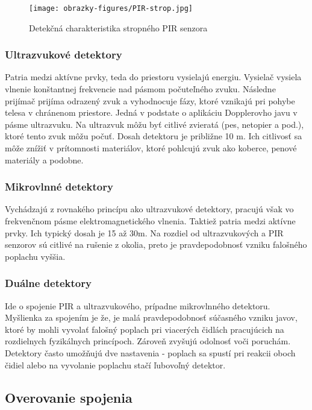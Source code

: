 \begin{figure}[ht]
    \centering
    \texttt{[image: obrazky-figures/PIR-strop.jpg]}
    \caption{Detekčná charakteristika stropného PIR senzora\cite{PIR-strop}}
    \label{fig:pir-strop}
\end{figure}

\subsubsection{Ultrazvukové detektory}

Patria medzi aktívne prvky, teda do priestoru vysielajú energiu. Vysielač vysiela vlnenie konštantnej frekvencie nad pásmom počuteľného zvuku. Následne prijímač prijíma odrazený zvuk a vyhodnocuje fázy, ktoré vznikajú pri pohybe telesa v chránenom priestore. Jedná v podstate o aplikáciu Dopplerovho javu v pásme ultrazvuku. Na ultrazvuk môžu byť citlivé zvieratá (pes, netopier a pod.), ktoré tento zvuk môžu počuť. Dosah detektoru je približne 10 m. Ich citlivosť sa môže znížiť v prítomnosti materiálov, ktoré pohlcujú zvuk ako koberce, penové materiály a podobne.\cite{Krecek}

\subsubsection{Mikrovlnné detektory}

Vychádzajú z rovnakého princípu ako ultrazvukové detektory, pracujú však vo frekvenčnom pásme elektromagnetického vlnenia. Taktiež patria medzi aktívne prvky. Ich typický dosah je 15 až 30m. Na rozdiel od ultrazvukových a PIR senzorov sú citlivé na rušenie z okolia, preto je pravdepodobnosť vzniku falošného poplachu vyššia.\cite{velas_ezs}

\subsubsection{Duálne detektory}

Ide o spojenie PIR a ultrazvukového, prípadne mikrovlnného detektoru. Myšlienka za spojením je že, je malá pravdepodobnosť súčasného vzniku javov, ktoré by mohli vyvolať falošný poplach pri viacerých čidlách pracujúcich na rozdielnych fyzikálnych princípoch. Zároveň zvyšujú odolnosť voči poruchám. Detektory často umožňujú dve nastavenia - poplach sa spustí pri reakcii oboch čidiel alebo na vyvolanie poplachu stačí ľubovoľný detektor.\cite{velas_ezs}

\subsection{Overovanie spojenia}

